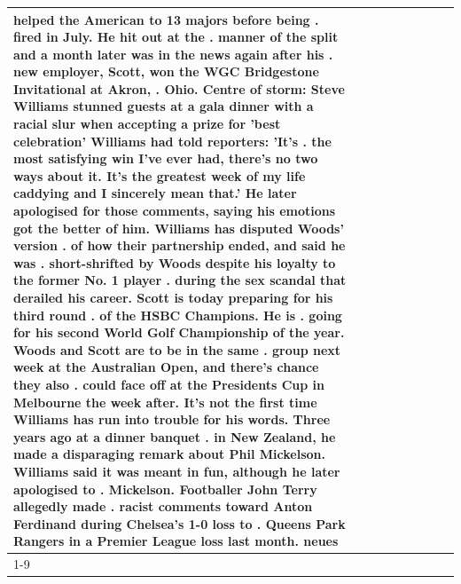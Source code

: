 \begin{table}[H]
\begin{tabular}{lllrlllll}
helped the American to 13 majors before being . fired in July. He hit out at the . manner of the split and a month later was in the news again after his . new employer, Scott, won the WGC Bridgestone Invitational at Akron, . Ohio. Centre of storm: Steve Williams stunned guests at a gala dinner with a racial slur when accepting a prize for 'best celebration' Williams had told reporters: 'It's . the most satisfying win I've ever had, there's no two ways about it. It's the greatest week of my life caddying and I sincerely mean that.' He later apologised for those comments, saying his emotions got the better of him. Williams has disputed Woods' version . of how their partnership ended, and said he was . short-shrifted by Woods despite his loyalty to the former No. 1 player . during the sex scandal that derailed his career. Scott is today preparing for his third round . of the HSBC Champions. He is . going for his second World Golf Championship of the year. Woods and Scott are to be in the same . group next week at the Australian Open, and there's chance they also . could face off at the Presidents Cup in Melbourne the week after. It's not the first time Williams has run into trouble for his words. Three years ago at a dinner banquet . in New Zealand, he made a disparaging remark about Phil Mickelson. Williams said it was meant in fun, although he later apologised to . Mickelson. Footballer John Terry allegedly made . racist comments toward Anton Ferdinand during Chelsea's 1-0 loss to . Queens Park Rangers in a Premier League loss last month. neues \\
\cline{1-9}

\end{tabular}
\end{table}
